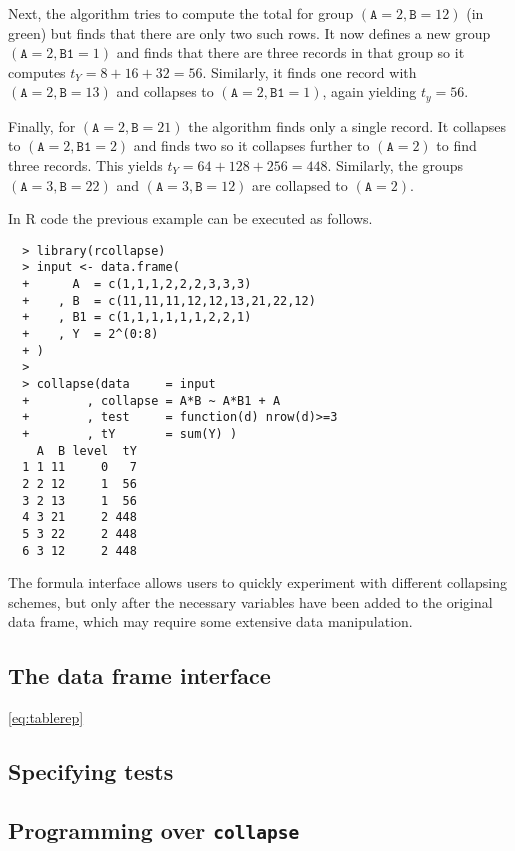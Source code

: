 \documentclass[11pt, fleqn]{article}
\begin{document}
Next, the algorithm tries to compute the total for group
$(\texttt{A}=2,\texttt{B}=12)$ (in green) but finds that there are only two
such rows. It now defines a new group $(\texttt{A}=2,\texttt{B1}=1)$ and finds
that there are three records in that group so it computes $t_Y=8+16+32=56$.
Similarly, it finds one record with $(\texttt{A}=2,\texttt{B}=13)$ and
collapses to $(\texttt{A}=2,\texttt{B1}=1)$, again yielding $t_y=56$.

Finally, for $(\texttt{A}=2,\texttt{B}=21)$ the algorithm finds only a single
record. It collapses to $(\texttt{A}=2,\texttt{B1}=2)$ and finds two so it
collapses further to $(\texttt{A}=2)$ to find three records.  This yields
$t_Y=64+128+256=448$. Similarly, the groups $(\texttt{A}=3, \texttt{B}=22)$ and
$(\texttt{A}=3,\texttt{B}=12)$ are collapsed to $(\texttt{A}=2)$.

In R code the previous example can be executed as follows.
\begin{verbatim}
  > library(rcollapse)
  > input <- data.frame(
  +      A  = c(1,1,1,2,2,2,3,3,3)
  +    , B  = c(11,11,11,12,12,13,21,22,12)
  +    , B1 = c(1,1,1,1,1,1,2,2,1)
  +    , Y  = 2^(0:8)
  + )
  >
  > collapse(data     = input
  +        , collapse = A*B ~ A*B1 + A
  +        , test     = function(d) nrow(d)>=3
  +        , tY       = sum(Y) )
    A  B level  tY
  1 1 11     0   7
  2 2 12     1  56
  3 2 13     1  56
  4 3 21     2 448
  5 3 22     2 448
  6 3 12     2 448
\end{verbatim}
%
The formula interface allows users to quickly experiment with different
collapsing schemes, but only after the necessary variables have been added to
the original data frame, which may require some extensive data manipulation.

\subsection{The data frame interface}
\eqref{eq:tablerep}




\subsection{Specifying tests}

\subsection{Programming over \texttt{collapse}}
\end{document}
